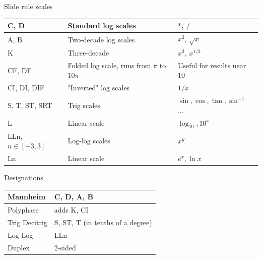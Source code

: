 \documentclass[aspectratio=169]{beamer}
\begin{document}
\begin{frame}{Slide rule scales}
    \begin{tabulary}{\textwidth}{|L|L|L|}
        \hline
        C, D &
        Standard log scales &
        $*$, $/$ \\
        \hline

        A, B &
        Two-decade log scales &
        $x^2$, $\sqrt{x}$ \\
        \hline

        K &
        Three-decade &
        $x^3$, $x^{1/3}$ \\
        \hline

        CF, DF &
        Folded log scale, runs from $\pi$ to $10\pi$ &
        Useful for results near 10 \\
        \hline

        CI, DI, DIF &
        "Inverted" log scales &
        $1/x$ \\
        \hline

        S, T, ST, SRT &
        Trig scales &
        $\sin, \cos, \tan, \sin^{-1}$ ... \\
        \hline

        L &
        Linear scale &
        $\log_{10}, 10^x$ \\
        \hline

        LLn, $n \in [-3, 3]$ &
        Log-log scales &
        $x^y$ \\
        \hline

        Ln &
        Linear scale &
        $e^x, \ln x$ \\
        \hline

    \end{tabulary}
\end{frame}

\begin{frame}{Designations}
    \begin{tabulary}{\textwidth}{|L|L|}
        \hline
        Mannheim &
        C, D, A, B \\
        \hline

        Polyphase &
        adds K, CI \\
        \hline

        Trig
        Decitrig &
        S, ST, T
        (in tenths of a degree) \\
        \hline

        Log Log &
        LLn \\
        \hline

        Duplex &
        2-sided \\
        \hline

    \end{tabulary}
\end{frame}
\end{document}
